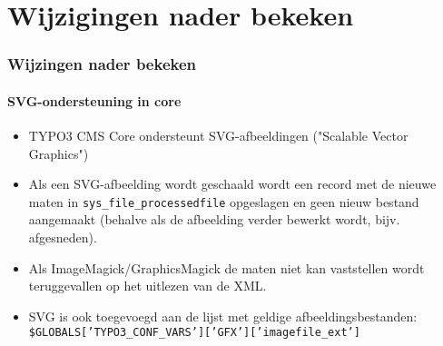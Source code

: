 %

\section{Wijzigingen nader bekeken}

\begin{frame}[fragile]
	\frametitle{Wijzingen nader bekeken}
	\framesubtitle{SVG-ondersteuning in core}

	\begin{itemize}
		\item TYPO3 CMS Core ondersteunt SVG-afbeeldingen ("Scalable Vector Graphics")

		\item Als een SVG-afbeelding wordt geschaald wordt een record met de nieuwe maten in
			\texttt{sys\_file\_processedfile} opgeslagen en geen nieuw bestand aangemaakt\newline
			\small(behalve als de afbeelding verder bewerkt wordt, bijv. afgesneden)\normalsize.

		\item Als ImageMagick/GraphicsMagick de maten niet kan vaststellen wordt teruggevallen
			op het uitlezen van de XML.

		\item SVG is ook toegevoegd aan de lijst met geldige afbeeldingsbestanden:\newline
			\texttt{\$GLOBALS['TYPO3\_CONF\_VARS']['GFX']['imagefile\_ext']}

	\end{itemize}

\end{frame}

